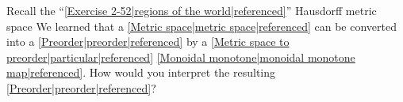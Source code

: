 
Recall the ``\ref{Exercise 2-52|regions of the world|referenced}'' Hausdorff metric space We learned that a \ref{Metric space|metric space|referenced} can be converted into a \ref{Preorder|preorder|referenced} by a \ref{Metric space to preorder|particular|referenced} \ref{Monoidal monotone|monoidal monotone map|referenced}. How would you interpret the resulting \ref{Preorder|preorder|referenced}?